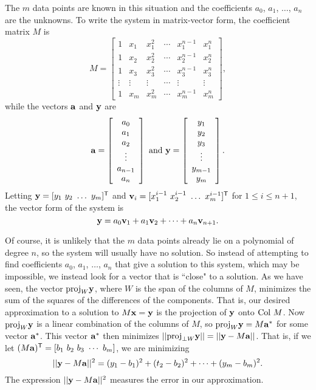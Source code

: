 The $m$ data points are known in this situation and the coefficients $a_0$, $a_1$, $\ldots$, $a_n$ are the unknowns. To write the system in matrix-vector form, the coefficient matrix $M$ is
\[M = \left[ \begin{array}{cccccc} 1&x_1&x_1^2& \cdots &x_1^{n-1}&x_1^{n} \\ 1&x_2&x_2^2& \cdots &x_2^{n-1}&x_2^{n} \\ 1&x_3&x_3^2& \cdots &x_3^{n-1}&x_3^{n} \\ \vdots & \vdots & \vdots & \cdots &\vdots &\vdots \\ 1&x_m&x_m^2& \cdots &x_m^{n-1}&x_m^{n} \end{array} \right],\]
while the vectors $\mathbf{a}$ and $\mathbf{y}$ are
\[\mathbf{a} = \left[ \begin{array}{c} a_{0} \\ a_{1} \\ a_{2} \\ \vdots \\ a_{n-1} \\a_{n} \end{array} \right] \text{ and } \mathbf{y} = \left[ \begin{array}{c} y_{1} \\ y_{2} \\ y_{3} \\ \vdots \\ y_{m-1} \\ y_{m} \end{array} \right].\]
Letting $\vy = [y_1 \ y_2 \ \ldots \ y_m]^{\tr}$ and $\mathbf{v}_i = [x_1^{i-1} \ x_2^{i-1} \ \ldots \ x_m^{i-1}]^{\mathsf{T}}$ for $1 \leq i \leq n+1$, the vector form of the system is 
\[\mathbf{y} = a_0\mathbf{v}_1 + a_1 \mathbf{v}_2 +  \cdots + a_n \mathbf{v}_{n+1}.\]

Of course, it is unlikely that the $m$ data points already lie on a polynomial of degree $n$, so the system will usually have no solution. So instead of attempting to find coefficients $a_0$, $a_1$, $\ldots$, $a_n$ that give a solution to this system, which may be impossible, we instead look for a vector that is ``close" to a solution. As we have seen, the vector $\text{proj}_{W} \mathbf{y}$, where $W$ is the span of the columns of $M$, minimizes the sum of the squares of the differences of the components. That is, our desired approximation to a solution to $M \mathbf{x} = \mathbf{y}$ is the projection of $\mathbf{y}$ onto $\text{Col } M$. Now $\text{proj}_W \mathbf{y}$ is a linear combination of the columns of $M$, so $\text{proj}_W \mathbf{y} = M \mathbf{a}^*$ for some vector $\mathbf{a}^*$. This vector $\mathbf{a}^*$ then minimizes $|| \text{proj}_{\perp W} \mathbf{y}|| = ||\mathbf{y} - M \mathbf{a} ||$. That is, if we let $(M\mathbf{a})^{\mathsf{T}} = [b_1 \ b_2 \ b_3 \ \cdots \ b_m]$, we are minimizing 
\begin{equation*}
||\mathbf{y} - M\mathbf{a}||^2 = (y_1-b_1)^2 + (t_2-b_2)^2 + \cdots + (y_m-b_m)^2. \label{eq:ls_1}
\end{equation*}
The expression $||\mathbf{y} - M\mathbf{a}||^2$ measures the error in our approximation. 

